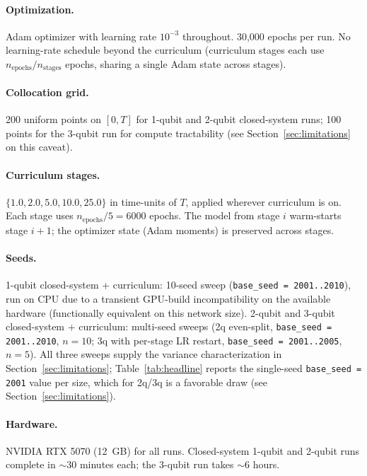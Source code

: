 \documentclass[11pt]{article}
\begin{document}
\paragraph{Optimization.}
Adam optimizer with learning rate $10^{-3}$ throughout. 30{,}000 epochs per run. No learning-rate schedule beyond the curriculum (curriculum stages each use $n_{\mathrm{epochs}} / n_{\mathrm{stages}}$ epochs, sharing a single Adam state across stages).

\paragraph{Collocation grid.}
200 uniform points on $[0, T]$ for 1-qubit and 2-qubit closed-system runs; 100 points for the 3-qubit run for compute tractability (see Section~\ref{sec:limitations} on this caveat).

\paragraph{Curriculum stages.}
$\{1.0, 2.0, 5.0, 10.0, 25.0\}$ in time-units of $T$, applied wherever curriculum is on. Each stage uses $n_{\mathrm{epochs}}/5 = 6000$ epochs. The model from stage $i$ warm-starts stage $i+1$; the optimizer state (Adam moments) is preserved across stages.

\paragraph{Seeds.}
1-qubit closed-system + curriculum: 10-seed sweep (\texttt{base\_seed = 2001..2010}), run on CPU due to a transient GPU-build incompatibility on the available hardware (functionally equivalent on this network size). 2-qubit and 3-qubit closed-system + curriculum: multi-seed sweeps (2q even-split, \texttt{base\_seed = 2001..2010}, $n = 10$; 3q with per-stage LR restart, \texttt{base\_seed = 2001..2005}, $n = 5$). All three sweeps supply the variance characterization in Section~\ref{sec:limitations}; Table~\ref{tab:headline} reports the single-seed \texttt{base\_seed = 2001} value per size, which for 2q/3q is a favorable draw (see Section~\ref{sec:limitations}).

\paragraph{Hardware.}
NVIDIA RTX 5070 (12~GB) for all runs. Closed-system 1-qubit and 2-qubit runs complete in $\sim 30$ minutes each; the 3-qubit run takes $\sim 6$ hours.
\end{document}
